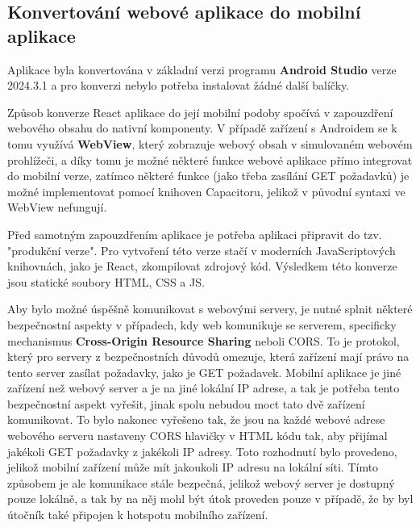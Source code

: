 \subsection{Konvertování webové aplikace do mobilní aplikace}\label{sec:KonvertovaniWeboveAplikaceDoMobilni}

Aplikace byla konvertována v základní verzi programu \textbf{Android Studio} verze 2024.3.1 a pro konverzi nebylo potřeba instalovat žádné další balíčky.

Způsob konverze React aplikace do její mobilní podoby spočívá v zapouzdření webového obsahu do nativní komponenty. V případě zařízení s Androidem se k tomu využívá \textbf{WebView}, který zobrazuje webový obsah v simulovaném webovém prohlížeči, a díky tomu je možné některé funkce webové aplikace přímo integrovat do mobilní verze, zatímco některé funkce (jako třeba zasílání GET požadavků) je možné implementovat pomocí knihoven Capacitoru, jelikož v původní syntaxi ve WebView nefungují.
\cite{CapacitorHowItWorks}

Před samotným zapouzdřením aplikace je potřeba aplikaci připravit do tzv. "produkční verze". Pro vytvoření této verze stačí v moderních JavaScriptových knihovnách, jako je React, zkompilovat zdrojový kód. Výsledkem této konverze jsou statické soubory HTML, CSS a JS.

Aby bylo možné úspěšně komunikovat s webovými servery, je nutné splnit některé bezpečnostní aspekty v případech, kdy web komunikuje se serverem, specificky mechanismus \textbf{Cross-Origin Resource Sharing} neboli CORS. To je protokol, který pro servery z bezpečnostních důvodů omezuje, která zařízení mají právo na tento server zasílat požadavky, jako je GET požadavek. Mobilní aplikace je jiné zařízení než webový server a je na jiné lokální IP adrese, a tak je potřeba tento bezpečnostní aspekt vyřešit, jinak spolu nebudou moct tato dvě zařízení komunikovat. To bylo nakonec vyřešeno tak, že jsou na každé webové adrese webového serveru nastaveny CORS hlavičky v HTML kódu tak, aby přijímal jakékoli GET požadavky z jakékoli IP adresy. Toto rozhodnutí bylo provedeno, jelikož mobilní zařízení může mít jakoukoli IP adresu na lokální síti. Tímto způsobem je ale komunikace stále bezpečná, jelikož webový server je dostupný pouze lokálně, a tak by na něj mohl být útok proveden pouze v případě, že by byl útočník také připojen k hotspotu mobilního zařízení.
\cite{CORShowItWorks}

